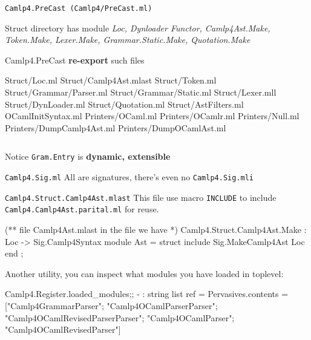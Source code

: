 \verb|Camlp4.PreCast (Camlp4/PreCast.ml)|

Struct directory has module \textit{Loc, Dynloader Functor,
  Camlp4Ast.Make, Token.Make, Lexer.Make, Grammar.Static.Make,
  Quotation.Make}

Camlp4.PreCast \textbf{re-export} such files

    \begin{bluetext}
    Struct/Loc.ml 
    Struct/Camlp4Ast.mlast 
    Struct/Token.ml 
    Struct/Grammar/Parser.ml 
    Struct/Grammar/Static.ml 
    Struct/Lexer.mll 
    Struct/DynLoader.ml 
    Struct/Quotation.ml 
    Struct/AstFilters.ml 
    OCamlInitSyntax.ml 
    Printers/OCaml.ml 
    Printers/OCamlr.ml
    Printers/Null.ml 
    Printers/DumpCamlp4Ast.ml
    Printers/DumpOCamlAst.ml 
    \end{bluetext}


\inputminted{ocaml}{camlp4/code/PreCast_OCamlInitSyntax.ml}


Notice \verb|Gram.Entry| is \textbf{ dynamic, extensible}


\verb|Camlp4.Sig.ml| All are signatures, there's even no
\verb|Camlp4.Sig.mli|

\verb|Camlp4.Struct.Camlp4Ast.mlast| This file use macro
\verb|INCLUDE| to include \verb|Camlp4.Camlp4Ast.parital.ml| for
reuse.
    

\begin{bluecode}
(** file Camlp4Ast.mlast 
  in the file we have *)
Camlp4.Struct.Camlp4Ast.Make : Loc -> Sig.Camlp4Syntax
  module Ast = struct
     include Sig.MakeCamlp4Ast Loc 
  end ;
\end{bluecode}

Another utility, you can inspect what modules you have loaded in toplevel:
\begin{bluecode}
Camlp4.Register.loaded_modules;;
- : string list ref =
{Pervasives.contents =
  ["Camlp4GrammarParser"; "Camlp4OCamlParserParser";
   "Camlp4OCamlRevisedParserParser"; "Camlp4OCamlParser";
   "Camlp4OCamlRevisedParser"]}
\end{bluecode}


